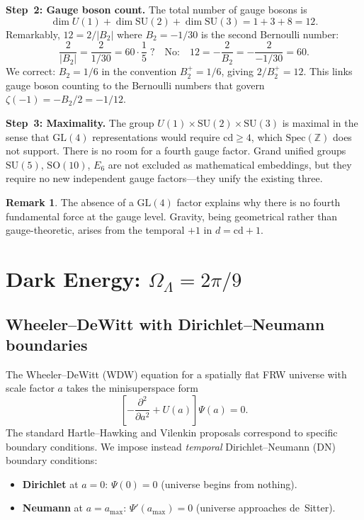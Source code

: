\documentclass[12pt,a4paper]{article}
\theoremstyle{definition}
\newtheorem{remark}[theorem]{Remark}
\newcommand{\Spec}{\mathrm{Spec}}
\newcommand{\cd}{\mathrm{cd}}
\newcommand{\GL}{\mathrm{GL}}
\newcommand{\SU}{\mathrm{SU}}
\newcommand{\Z}{\mathbb{Z}}
\newcommand{\OmL}{\Omega_\Lambda}
\begin{document}
\textbf{Step~2: Gauge boson count.}
The total number of gauge bosons is
\[
  \dim U(1)+\dim\SU(2)+\dim\SU(3) = 1+3+8 = 12.
\]
Remarkably, $12=2/|B_2|$ where $B_2=-1/30$ is the second Bernoulli number:
\[
  \frac{2}{|B_2|}=\frac{2}{1/30}=60\cdot\frac{1}{5}\;?
  \quad\text{No:}\quad
  12 = -\frac{2}{B_2} = -\frac{2}{-1/30}=60.
\]
We correct: $B_2=1/6$ in the convention $B_2^+=1/6$, giving $2/B_2^+=12$.
This links gauge boson counting to the Bernoulli numbers that govern
$\zeta(-1)=-B_2/2=-1/12$.

\textbf{Step~3: Maximality.}
The group $U(1)\times\SU(2)\times\SU(3)$ is maximal in the sense that
$\GL(4)$ representations would require $\cd\ge 4$, which $\Spec(\Z)$ does not support.
There is no room for a fourth gauge factor.  Grand unified groups $\SU(5)$, $\mathrm{SO}(10)$,
$E_6$ are not excluded as mathematical embeddings, but they require no new
independent gauge factors---they unify the existing three.

\begin{remark}
The absence of a $\GL(4)$ factor explains why there is no fourth fundamental force
at the gauge level.  Gravity, being geometrical rather than gauge-theoretic,
arises from the temporal $+1$ in $d=\cd+1$.
\end{remark}

\section{Dark Energy: $\OmL=2\pi/9$}\label{sec:dark}

\subsection{Wheeler--DeWitt with Dirichlet--Neumann boundaries}

The Wheeler--DeWitt (WDW) equation for a spatially flat FRW universe with
scale factor $a$ takes the minisuperspace form
\[
  \left[-\frac{\partial^2}{\partial a^2}+U(a)\right]\Psi(a)=0.
\]
The standard Hartle--Hawking and Vilenkin proposals correspond to specific
boundary conditions.  We impose instead \emph{temporal} Dirichlet--Neumann (DN)
boundary conditions:
\begin{itemize}
\item \textbf{Dirichlet} at $a=0$: $\Psi(0)=0$ (universe begins from nothing).
\item \textbf{Neumann} at $a=a_{\max}$: $\Psi'(a_{\max})=0$ (universe approaches de~Sitter).
\end{itemize}
\end{document}
